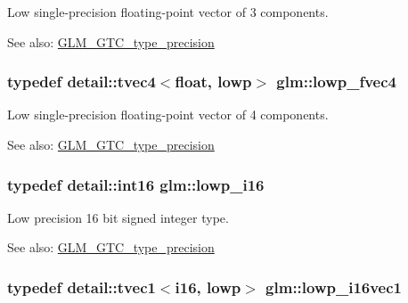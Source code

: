 Low single-precision floating-point vector of 3 components. \begin{Desc}
\item[See also:]\hyperlink{group__gtc__type__precision}{GLM\_\-GTC\_\-type\_\-precision} \end{Desc}
\hypertarget{group__gtc__type__precision_g0d016cdbff067c450122115d0620bf85}{
\subsubsection[lowp\_\-fvec4]{\setlength{\rightskip}{0pt plus 5cm}typedef detail::tvec4$<$float, lowp$>$ {\bf glm::lowp\_\-fvec4}}}
\label{group__gtc__type__precision_g0d016cdbff067c450122115d0620bf85}


Low single-precision floating-point vector of 4 components. \begin{Desc}
\item[See also:]\hyperlink{group__gtc__type__precision}{GLM\_\-GTC\_\-type\_\-precision} \end{Desc}
\hypertarget{group__gtc__type__precision_gf7bbfd31bcec25a416ea94d09efb5451}{
\subsubsection[lowp\_\-i16]{\setlength{\rightskip}{0pt plus 5cm}typedef detail::int16 {\bf glm::lowp\_\-i16}}}
\label{group__gtc__type__precision_gf7bbfd31bcec25a416ea94d09efb5451}


Low precision 16 bit signed integer type. \begin{Desc}
\item[See also:]\hyperlink{group__gtc__type__precision}{GLM\_\-GTC\_\-type\_\-precision} \end{Desc}
\hypertarget{group__gtc__type__precision_g6f1e42c07424a2f14faf731c74ba2153}{
\subsubsection[lowp\_\-i16vec1]{\setlength{\rightskip}{0pt plus 5cm}typedef detail::tvec1$<$i16, lowp$>$ {\bf glm::lowp\_\-i16vec1}}}
\label{group__gtc__type__precision_g6f1e42c07424a2f14faf731c74ba2153}


